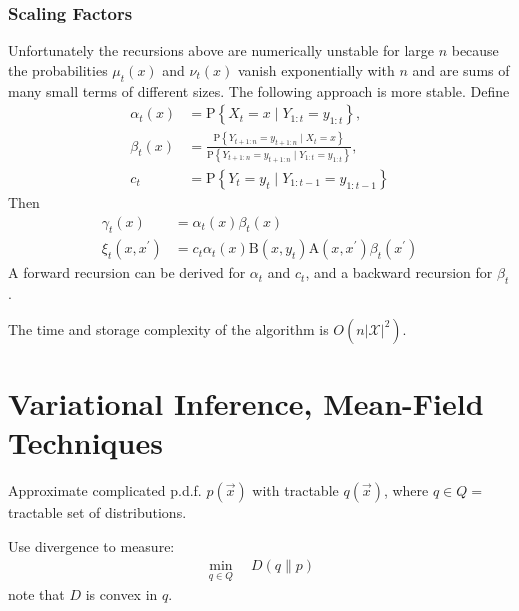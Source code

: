 \documentclass[11pt]{elegantbook}
\begin{document}
\subsection{Scaling Factors}
Unfortunately the recursions above are numerically unstable for large $n$ because the probabilities $\mu_t(x)$ and $\nu_t(x)$ vanish exponentially with $n$ and are sums of many small terms of different sizes. The following approach is more stable. Define
$$
\begin{aligned}
\alpha_t(x) &=\mathrm{P}\left\{X_t=x \mid Y_{1: t}=y_{1: t}\right\}, \\
\beta_t(x) &=\frac{\mathrm{P}\left\{Y_{t+1: n}=y_{t+1: n} \mid X_t=x\right\}}{\mathrm{P}\left\{Y_{t+1: n}=y_{t+1: n} \mid Y_{1: t}=y_{1: t}\right\}}, \\
c_t &=\mathrm{P}\left\{Y_t=y_t \mid Y_{1: t-1}=y_{1: t-1}\right\}
\end{aligned}
$$
Then
$$
\begin{aligned}
\gamma_t(x) &=\alpha_t(x) \beta_t(x) \\
\xi_t\left(x, x^{\prime}\right) &=c_t \alpha_t(x) \mathrm{B}\left(x, y_t\right) \mathrm{A}\left(x, x^{\prime}\right) \beta_t\left(x^{\prime}\right)
\end{aligned}
$$
A forward recursion can be derived for $\alpha_t$ and $c_t$, and a backward recursion for $\beta_t$.

The time and storage complexity of the algorithm is $O\left(n|\mathcal{X}|^2\right)$.






























\chapter{Variational Inference, Mean-Field Techniques}
Approximate complicated p.d.f. $p(\vec{x})$ with tractable $q(\vec{x})$, where $q\in Q=$ tractable set of distributions.

Use divergence to measure:
\begin{equation}
    \begin{aligned}
        \min_{q\in Q}\quad D(q\| p)
    \end{aligned}
    \nonumber
\end{equation}
note that $D$ is convex in $q$.
\end{document}

